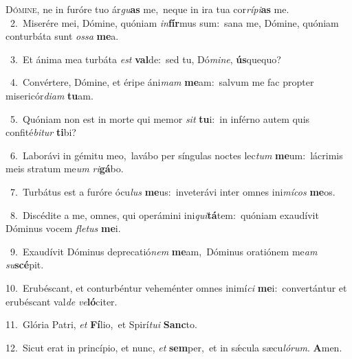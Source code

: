\lettrine{\initial\textcolor{\initialcolor}{D}}{ómine,} ne in furóre tuo ár\-\textit{gu}\-\textbf{as} me,~\star neque in ira tua cor\-\textit{rí}\-\textit{pi}\textbf{as} me.\\
{\numbfont\textcolor{\numbcolor}{~2.}}~Miserére mei, Dómine, quóniam \textit{in}\-\textbf{fír}mus sum:~\star sana me, Dómine, quóniam conturbáta sunt \textit{os}\-\textit{sa} \textbf{me}\-a.\par
{\numbfont\textcolor{\numbcolor}{~3.}}~Et ánima mea turbáta \textit{est} \textbf{val}\-de:~\star sed tu, Dó\-\textit{mi}\-\textit{ne}, \textbf{ús}\-quequo?\par
{\numbfont\textcolor{\numbcolor}{~4.}}~Convértere, Dómine, et éripe áni\textit{mam} \textbf{me}\-am:~\star salvum me fac propter misericór\-\textit{di}\-\textit{am} \textbf{tu}\-am.\par
{\numbfont\textcolor{\numbcolor}{~5.}}~Quóniam non est in morte qui memor \textit{sit} \textbf{tu}\-i:~\star in inférno autem quis confité\-\textit{bi}\-\textit{tur} \textbf{ti}\-bi?\par
{\numbfont\textcolor{\numbcolor}{~6.}}~Laborávi in gémitu meo,~\dagger lavábo per síngulas noctes lec\textit{tum} \textbf{me}\-um:~\star lácrimis meis stratum me\textit{um} \textit{ri}\-\textbf{gá}bo.\par
{\numbfont\textcolor{\numbcolor}{~7.}}~Turbátus est a furóre ócu\textit{lus} \textbf{me}\-us:~\star inveterávi inter omnes ini\-\textit{mí}\-\textit{cos} \textbf{me}\-os.\par
{\numbfont\textcolor{\numbcolor}{~8.}}~Discédite a me, omnes, qui operámini ini\-\textit{qui}\-\textbf{tá}tem:~\star quóniam exaudívit Dóminus vocem \textit{fle}\-\textit{tus} \textbf{me}\-i.\par
{\numbfont\textcolor{\numbcolor}{~9.}}~Exaudívit Dóminus deprecatió\textit{nem} \textbf{me}\-am,~\star Dóminus oratiónem me\textit{am} \textit{su}\-\textbf{scé}pit.\par
{\numbfont\textcolor{\numbcolor}{10.}}~Erubéscant, et conturbéntur veheménter omnes inimí\textit{ci} \textbf{me}\-i:~\star convertántur et erubéscant val\textit{de} \textit{ve}\-\textbf{ló}citer.\par
{\numbfont\textcolor{\numbcolor}{11.}}~Glória Patri, \textit{et} \textbf{Fí}\-lio,~\star et Spirí\-\textit{tu}\-\textit{i} \textbf{Sanc}\-to.\par
{\numbfont\textcolor{\numbcolor}{12.}}~Sicut erat in princípio, et nunc, \textit{et} \textbf{sem}\-per,~\star et in sǽcula sæcu\-\textit{ló}\-\textit{rum}. \textbf{A}\-men.\par
